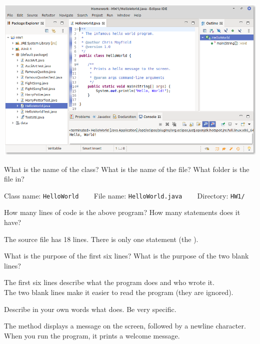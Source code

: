 
\begin{center}
\includegraphics[width=0.95\linewidth]{eclipse.png}
\end{center}




\Q What is the name of the class?
What is the name of the file?
What folder is the file in?

\begin{answer}[3em]
Class name: \texttt{HelloWorld} ~~~
File name: \texttt{HelloWorld.java} ~~~
Directory: \texttt{HW1/}
\end{answer}


\Q How many lines of code is the above program?
How many statements does it have?

\begin{answer}[3em]
The source file has 18 lines.
There is only one statement (the ).
\end{answer}


\Q \label{javadoc}
What is the purpose of the first six lines?
What is the purpose of the two blank lines?

\begin{answer}[3em]
The first six lines describe what the program does and who wrote it. \\
The two blank lines make it easier to read the program (they are ignored).
\end{answer}


\Q \label{println}
Describe in your own words what  does.
Be very specific.

\begin{answer}[3em]
The  method displays a message on the screen, followed by a newline character.
When you run the  program, it prints a welcome message.
\end{answer}
